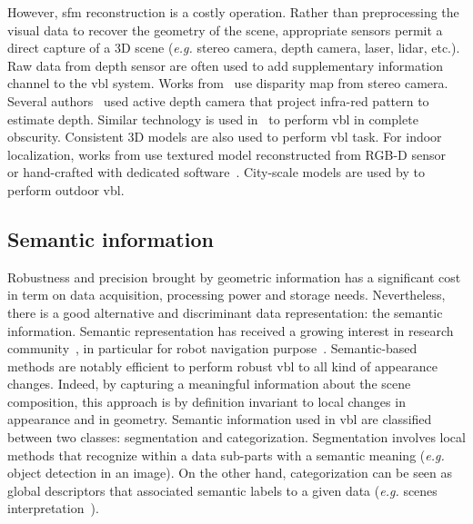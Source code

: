 			However, \ac{sfm} reconstruction is a costly operation. Rather than preprocessing the visual data to recover the geometry of the scene, appropriate sensors permit a direct capture of a 3D scene (\textit{e.g.} stereo camera, depth camera, laser, lidar, etc.). Raw data from depth sensor are often used to add supplementary information channel to the \ac{vbl} system. Works from~\citep{Ni2009,McManus2014,Wan2014} use disparity map from stereo camera. Several authors~\citep{Shotton2013,Guzman-rivera2014,Glocker2015} used active depth camera that project infra-red pattern to estimate depth. Similar technology is used in~\citep{Li2016a} to perform \ac{vbl} in complete obscurity. Consistent 3D models are also used to perform \ac{vbl} task. For indoor localization, works from \citep{Shotton2013,Pascoe2015} use textured model reconstructed from RGB-D sensor~\citep{Shotton2013} or hand-crafted with dedicated software~\citep{Pascoe2015}. City-scale models are used by \citep{Aubry2014,Poglitsch2015,Pascoe2015a,Pascoe2015b,Caselitz2016} to perform outdoor \ac{vbl}. 



	\subsection{Semantic information}
		\label{subsec:semantic_info}
		Robustness and precision brought by geometric information has a significant cost in term on data acquisition, processing power and storage needs. Nevertheless, there is a good alternative and discriminant data representation: the semantic information. Semantic representation has received a growing interest in research community~\citep{Liu2016a}, in particular for robot navigation purpose~\citep{Kostavelis2015}. Semantic-based methods are notably efficient to perform robust \ac{vbl} to all kind of appearance changes. Indeed, by capturing a meaningful information about the scene composition, this approach is by definition invariant to local changes in appearance and in geometry. Semantic information used in \ac{vbl} are classified between two classes: segmentation and categorization. Segmentation involves local methods that recognize within a data sub-parts with a semantic meaning (\textit{e.g.} object detection in an image). On the other hand, categorization can be seen as global descriptors that associated semantic labels to a given data (\textit{e.g.} scenes interpretation~\citep{Deng2009}).
		
